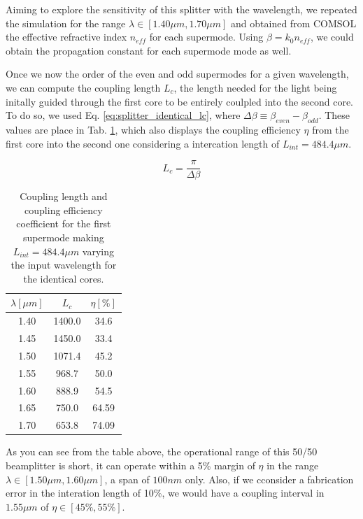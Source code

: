 \documentclass[conference, a4paper]{IEEEtran}
\begin{document}
Aiming to explore the sensitivity of this splitter with the wavelength, we repeated the simulation for the range $\lambda \in [1.40 \mu m, 1.70 \mu m]$ and obtained from COMSOL the effective refractive index $n_{eff}$ for each supermode. Using $\beta = k_0 n_{eff}$, we could obtain the propagation constant for each supermode mode as well.

Once we now the order of the even and odd supermodes for a given wavelength, we can compute the coupling length $L_c$, the length needed for the light being initally guided through the first core to be entirely coulpled into the second core. To do so, we used Eq. \eqref{eq:splitter_identical_lc}, where $\Delta \beta \equiv \beta_{even} - \beta_{odd}$. These values are place in Tab. \ref{tab:splitter_identical_lc}, which also displays the coupling efficiency $\eta$ from the first core into the second one considering a intercation length of $L_{int} = 484.4\mu m$.

\begin{equation}
    L_c = \frac{\pi}{\Delta \beta}
    \label{eq:splitter_identical_lc}
\end{equation}

\begin{table}[H]
    \centering
    \begin{tabular}{ccc}
        \toprule
        $\lambda [\mu m]$ & $L_c$ & $\eta[\%]$ \\
        \midrule
        1.40 & 1400.0 & 34.6 \\
        1.45 & 1450.0 & 33.4 \\
        1.50 & 1071.4 & 45.2 \\
        1.55 & 968.7 & 50.0 \\
        1.60 & 888.9 & 54.5 \\
        1.65 & 750.0 & 64.59 \\
        1.70 & 653.8 & 74.09 \\    
        \bottomrule
    \end{tabular}
    \caption{Coupling length and coupling efficiency coefficient for the first supermode making $L_{int} = 484.4\mu m$ varying the input wavelength for the identical cores.}
    \label{tab:splitter_identical_lc}
\end{table}

As you can see from the table above, the operational range of this 50/50 beamplitter is short, it can operate within a 5\% margin of $\eta$ in the range $\lambda \in [1.50\mu m, 1.60\mu m]$, a span of $100nm$ only. Also, if we cconsider a fabrication error in the interation length of 10\%, we would have a coupling interval in $1.55 \mu m$ of $\eta \in [45\%, 55\%]$.  
\end{document}
